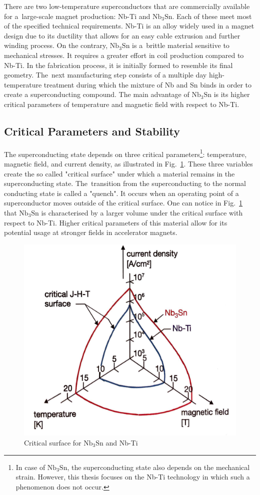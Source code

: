 There are two low-temperature superconductors that are commercially available for a~large-scale magnet production: Nb-Ti and $\text{Nb}_3 \text{Sn}$. Each of these meet most of the specified technical requirements. Nb-Ti is an alloy widely used in a magnet design due to its ductility that allows for an easy cable extrusion and further winding process. On the contrary, $\text{Nb}_3 \text{Sn}$ is a~brittle material sensitive to mechanical stresses. It requires a greater effort in coil production compared to Nb-Ti. In the fabrication process, it is initially formed to resemble its final geometry. The~next manufacturing step consists of a multiple day high-temperature treatment during which the mixture of Nb and Sn binds in order to create a superconducting compound. The main advantage of $\text{Nb}_3 \text{Sn}$ is its higher critical parameters of temperature and magnetic field with respect to Nb-Ti.~\cite[p.~29-41]{superconducting_accelerator_magnets}

\subsection{Critical Parameters and Stability}

The superconducting state depends on three critical parameters\footnote{In case of $\text{Nb}_3 \text{Sn}$, the superconducting state also depends on the mechanical strain. However, this thesis focuses on the Nb-Ti technology in which such a phenomenon does not occur.}: temperature, magnetic field, and current density, as illustrated in Fig.~\ref{fig:scheme_critical_surface}. These three variables create the so called "critical surface" under which a material remains in the superconducting state. The~transition from the superconducting to the normal conducting state is called a "quench". It occurs when an operating point of a superconductor moves outside of the critical surface. One can notice in Fig.~\ref{fig:scheme_critical_surface} that $\text{Nb}_3 \text{Sn}$ is characterised by a larger volume under the critical surface with respect to Nb-Ti. Higher critical parameters of this material allow for its potential usage at stronger fields in accelerator magnets.

\begin{figure}[H]
    \centering
    \includegraphics[width=0.35\linewidth]{sections/introduction/figures/critical_surface_scheme.png}
    \caption{Critical surface for $\text{Nb}_\text{3}\text{Sn}$ and Nb-Ti \cite{evans_marvel_of_technology}}
    \label{fig:scheme_critical_surface}
\end{figure} 

